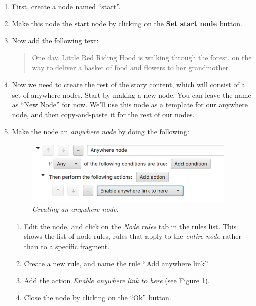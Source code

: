 \documentclass{article}
\begin{document}
\begin{enumerate}
  \item First, create a node named ``start''.
  \item Make this node the start node by clicking on the \textbf{Set start node} button.
  \item Now add the following text:

\begin{quotation}
\noindent One day, Little Red Riding Hood is walking through the forest, on the way to deliver a basket of food and flowers to her grandmother. 
\end{quotation}

\item Now we need to create the rest of the story content, which will consist of a set of anywhere nodes. Start by making a new node. You can leave the name as ``New Node'' for now. We'll use this node as a template for our anywhere node, and then copy-and-paste it for the rest of our nodes.
\item Make the node an \textit{anywhere node} by doing the following:
\begin{figure}[h]
  \centering
  \includegraphics[width=10cm]{images/hypedyn-tutorial-2-figure-9}
  \caption{\textit{Creating an anywhere node.}}
  \label{fig:tut2:anywherenode}
\end{figure} 

\begin{enumerate}
\item Edit the node, and click on the \textit{Node rules} tab in the rules list. This shows the list of node rules, rules that apply to the \textit{entire node} rather than to a specific fragment.
  \item Create a new rule, and name the rule ``Add anywhere link''.
  \item Add the action \textit{Enable anywhere link to here} (see Figure \ref{fig:tut2:anywherenode}).
\item Close the node by clicking on the ``Ok'' button.
\end{enumerate}


\end{enumerate}
\end{document}

